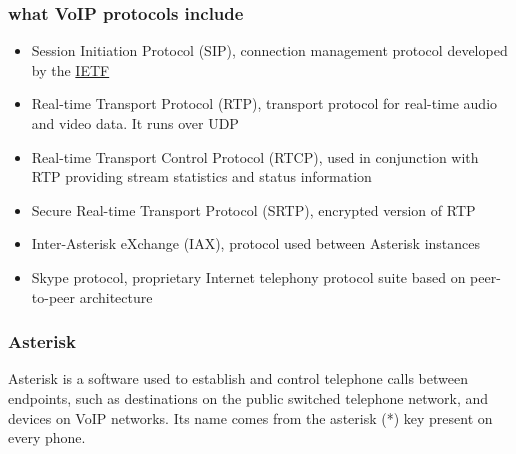 \documentclass[a4paper,12pt]{book}
\begin{document}
\subsubsection{what VoIP protocols include}
\begin{itemize}
\item{Session Initiation Protocol (SIP), connection management protocol developed by the \href{https://www.ietf.org/}{IETF}}
\item{Real-time Transport Protocol (RTP), transport protocol for real-time audio and video data. It runs over UDP}
\item{Real-time Transport Control Protocol (RTCP), used in conjunction with RTP providing stream statistics and status information}
\item{Secure Real-time Transport Protocol (SRTP), encrypted version of RTP}
\item{Inter-Asterisk eXchange (IAX), protocol used between Asterisk instances}
\item{Skype protocol, proprietary Internet telephony protocol suite based on peer-to-peer architecture}
\end{itemize}

\subsubsection{Asterisk }%
Asterisk is a software used to establish and control telephone calls between endpoints, such as destinations on the public switched telephone network, and devices on VoIP networks. Its name comes from the asterisk (*) key present on every phone.
\end{document}
